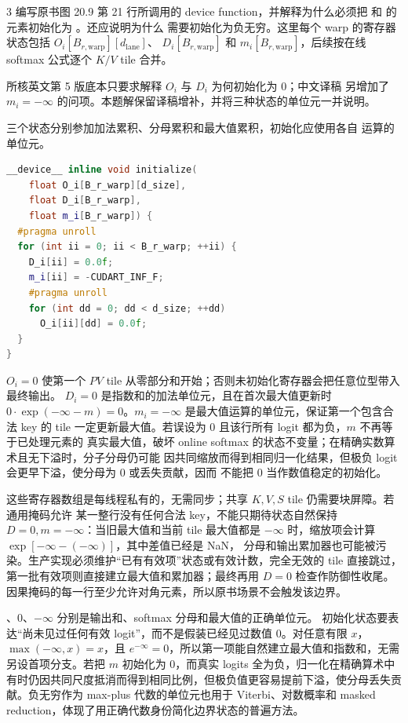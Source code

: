 \begin{solutionexercise}{3}
\problemheading 编写原书图 20.9 第 21 行所调用的  device
function，并解释为什么必须把  和  的元素初始化为
。还应说明为什么  需要初始化为负无穷。这里每个 warp 的寄存器
状态包括 $O_i[B_{r,\mathrm{warp}}][d_{\mathrm{lane}}]$、
$D_i[B_{r,\mathrm{warp}}]$ 和 $m_i[B_{r,\mathrm{warp}}]$，后续按在线 softmax 公式逐个
$K/V$ tile 合并。

\editorialnote 所核英文第 5 版底本只要求解释 $O_i$ 与 $D_i$ 为何初始化为 0；中文译稿
另增加了 $m_i=-\infty$ 的问项。本题解保留译稿增补，并将三种状态的单位元一并说明。

\approachheading 三个状态分别参加加法累积、分母累积和最大值累积，初始化应使用各自
运算的单位元。

\answerheading
\begin{lstlisting}[language=C++]
__device__ inline void initialize(
    float O_i[B_r_warp][d_size],
    float D_i[B_r_warp],
    float m_i[B_r_warp]) {
  #pragma unroll
  for (int ii = 0; ii < B_r_warp; ++ii) {
    D_i[ii] = 0.0f;
    m_i[ii] = -CUDART_INF_F;
    #pragma unroll
    for (int dd = 0; dd < d_size; ++dd)
      O_i[ii][dd] = 0.0f;
  }
}
\end{lstlisting}
$O_i=0$ 使第一个 $PV$ tile 从零部分和开始；否则未初始化寄存器会把任意位型带入最终输出。
$D_i=0$ 是指数和的加法单位元，且在首次最大值更新时
$0\cdot\exp(-\infty-m)=0$。$m_i=-\infty$ 是最大值运算的单位元，保证第一个包含合法 key
的 tile 一定更新最大值。若误设为 0 且该行所有 logit 都为负，$m$ 不再等于已处理元素的
真实最大值，破坏 online softmax 的状态不变量；在精确实数算术且无下溢时，分子分母仍可能
因共同缩放而得到相同归一化结果，但极负 logit 会更早下溢，使分母为 0 或丢失贡献，因而
不能把 0 当作数值稳定的初始化。

这些寄存器数组是每线程私有的，无需同步；共享 $K,V,S$ tile 仍需要块屏障。若通用掩码允许
某一整行没有任何合法 key，不能只期待状态自然保持 $D=0,m=-\infty$：当旧最大值和当前 tile
最大值都是 $-\infty$ 时，缩放项会计算 $\exp[-\infty-(-\infty)]$，其中差值已经是 NaN，
分母和输出累加器也可能被污染。生产实现必须维护“已有有效项”状态或有效计数，完全无效的
tile 直接跳过，第一批有效项则直接建立最大值和累加器；最终再用 $D=0$ 检查作防御性收尾。
因果掩码的每一行至少允许对角元素，所以原书场景不会触发该边界。

、0、$-\infty$ 分别是输出和、softmax 分母和最大值的正确单位元。
\discussionheading
{}
初始化状态要表达“尚未见过任何有效 logit”，而不是假装已经见过数值 0。对任意有限 $x$，$\max(-\infty,x)=x$，且 $e^{-\infty}=0$，所以第一项能自然建立最大值和指数和，无需另设首项分支。若把 $m$ 初始化为 0，而真实 logits 全为负，归一化在精确算术中有时仍因共同尺度抵消而得到相同比例，但极负值更容易提前下溢，使分母丢失贡献。负无穷作为 max-plus 代数的单位元也用于 Viterbi、对数概率和 masked reduction，体现了用正确代数身份简化边界状态的普遍方法。


\end{solutionexercise}
